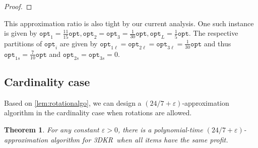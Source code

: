 \documentclass[10pt,a4paper]{amsart}
\newcommand{\mt}[1]{#1}
\newcommand{\eps}{\varepsilon}
\newcommand{\tdkr}{\textsc{3DKR}}
\newtheorem{theorem}{Theorem}[section]
\theoremstyle{definition}
\newcommand{\opt}{\mathtt{opt}}
\begin{document}
\begin{proof}
\end{proof}
\mt{This approximation ratio is also tight by our current analysis. One such instance is given by $\opt_1=\frac{11}{15}\opt, \opt_2=\opt_3=\frac{1}{30}\opt, \opt_L=\frac{1}{5}\opt$. The respective partitions of $\opt_i$ are given by $\opt_{1\ell}=\opt_{2\ell}=\opt_{3\ell}=\frac{1}{30}\opt$ and thus $\opt_{1s}=\frac{7}{10}\opt$ and $\opt_{2s}=\opt_{3s}=0$.}









\subsection{Cardinality case}
\label{sec:tdkrc}
Based on \cref{lem:rotationalgo}, we can design a $(24/7+\eps)$-approximation algorithm in the cardinality case when rotations are allowed.

\begin{theorem}
    \label{thm:r3dkce}
   For any constant $\eps>0$, there is a polynomial-time $(24/7 +\eps)$-approximation algorithm for \tdkr~when all items have the same profit.  
\end{theorem}
\end{document}
